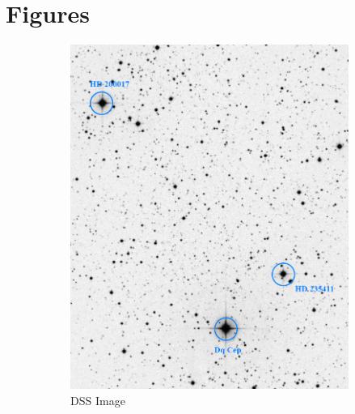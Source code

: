 \documentclass[]{article}
\begin{document}
\section{Figures}
\begin{figure}[H]
	\centering
	\begin{subfigure}[]{.45\textwidth}
		\centering
		\includegraphics[width=\textwidth]{figs/dss_map.png}
		\caption{DSS Image\footnotemark}
	\end{subfigure}
	\qquad
	\begin{subfigure}[]{.45\textwidth}
		\centering

\end{subfigure}
\end{figure}
\end{document}
